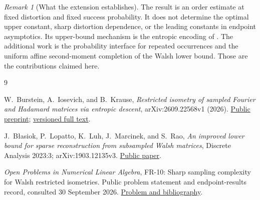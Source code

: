 \documentclass[11pt]{article}
\theoremstyle{remark}
\newtheorem{remark}[theorem]{Remark}
\newcommand{\1}{\mathbf 1}
\begin{document}
\begin{remark}[What the extension establishes]
The result is an order estimate at fixed distortion and fixed success
probability. It does not determine the optimal upper constant, sharp
distortion dependence, or the leading constants in endpoint asymptotics.
Its upper-bound mechanism is the entropic encoding of \cite{BIK}.
The additional work is the probability interface for repeated
occurrences and the uniform affine second-moment completion of the
Walsh lower bound. Those are the contributions claimed here.
\end{remark}

\begin{thebibliography}{9}

W.~Burstein, A.~Iosevich, and B.~Krause,
\emph{Restricted isometry of sampled Fourier and Hadamard matrices via
entropic descent}, arXiv:2609.22568v1 (2026).
\href{https://arxiv.org/abs/2609.22568v1}{Public preprint};
\href{https://arxiv.org/html/2609.22568v1}{versioned full text}.

J.~B{\l}asiok, P.~Lopatto, K.~Luh, J.~Marcinek, and S.~Rao,
\emph{An improved lower bound for sparse reconstruction from subsampled
Walsh matrices}, Discrete Analysis 2023:3;
arXiv:1903.12135v3.
\href{https://arxiv.org/abs/1903.12135v3}{Public paper}.

\emph{Open Problems in Numerical Linear Algebra},
FR-10: Sharp sampling complexity for Walsh restricted isometries.
Public problem statement and endpoint-results record, consulted
30 September 2026.
\href{https://github.com/ajt60gaibb/OpenProblemsInNLA/blob/main/frames-and-matrix-designs/FR-10/README.md}{Problem and bibliography}.

\end{thebibliography}
\end{document}
